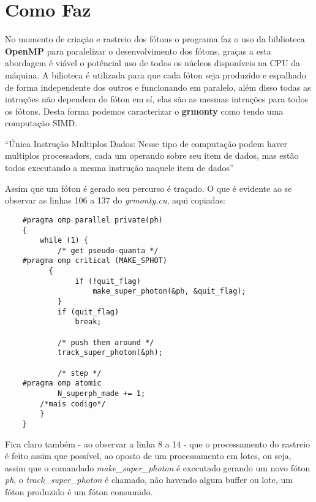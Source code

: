 \section{Como Faz}

  No momento de criação e rastreio dos fótons o programa faz o uso da biblioteca \textbf{OpenMP} para paralelizar o desenvolvimento dos fótons, graças a esta abordagem é viável o potêncial uso de todos os núcleos disponíveis na CPU da máquina. A bilioteca é utilizada para que cada fóton seja produzido e espalhado de forma independente dos outros e funcionando em paralelo, além disso todas as intruções não dependem do fóton em sí, elas são as mesmas intruções para todos os fótons. Desta forma podemos caracterizar o \textbf{grmonty} como tendo uma computação SIMD.

  ``Única Instrução Multiplos Dados: Nesse tipo de computação podem haver multiplos processadors, cada um operando sobre seu item de dados, mas estão todos executando a mesma instrução naquele item de dados''\citep[p.84, traduzido]{HCP:16}


  Assim que um fóton é gerado seu percurso é traçado. O que é evidente ao se observar as linhas 106 a 137 do \textit{grmonty.cu}, aqui copiadas:

  \begin{lstlisting}
    #pragma omp parallel private(ph)
  	{
  		while (1) {
  			/* get pseudo-quanta */
    #pragma omp critical (MAKE_SPHOT)
  		  {
  				if (!quit_flag)
  					make_super_photon(&ph, &quit_flag);
  			}
  			if (quit_flag)
  				break;

  			/* push them around */
  			track_super_photon(&ph);

  			/* step */
    #pragma omp atomic
  			N_superph_made += 1;
        /*mais codigo*/
  		}
  	}
  \end{lstlisting}

  Fica claro também - ao observar a linha 8 a 14 - que o processamento do rastreio é feito assim que possível, ao oposto de um processamento em lotes, ou seja, assim que o comandado \textit{make\_super\_photon} é executado gerando um novo fóton \textit{ph}, o  \textit{track\_super\_photon} é chamado, não havendo algum buffer ou lote, um fóton produzido é um fóton consumido.

